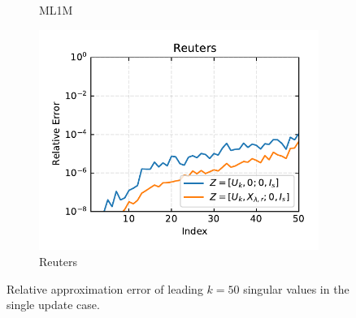 \begin{figure}[h]
\begin{subfigure}[b]{0.3\textwidth}
        \caption{ML1M}
        \label{fig:single_ml1m_rel_err}
    \end{subfigure}
    \begin{subfigure}[b]{0.3\textwidth}
        \centering
        \includegraphics[width=\textwidth]{figures/single/reuters/relative_errors_reuters_batch_split_1.pdf}
        \caption{Reuters}
        \label{fig:single_reuters_rel_err}
    \end{subfigure}
    \caption{Relative approximation error of leading $k=50$ singular values in the single update case.}
    \label{fig:single_rel_err}
\end{figure}

